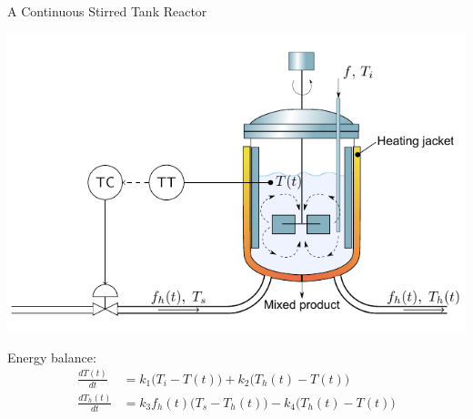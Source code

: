 \documentclass[presentation,aspectratio=169]{beamer}
\begin{document}
\begin{frame}[label={sec:org832cf6b}]{A Continuous Stirred Tank Reactor}
\begin{center}
\includegraphics[height=0.4\textheight]{../../figures/stirred_tank_heat_exchange}
\end{center}

Energy balance:
\begin{align*}
\frac{dT(t)}{dt} &= k_1\big( T_i - T(t) \big) + k_2 \big( T_h(t) - T(t)\big)\\
\frac{dT_h(t)}{dt} &= k_3f_h(t)\big( T_s - T_h(t) \big) - k_4 \big( T_h(t) - T(t)\big)
\end{align*}
\end{frame}
\end{document}

